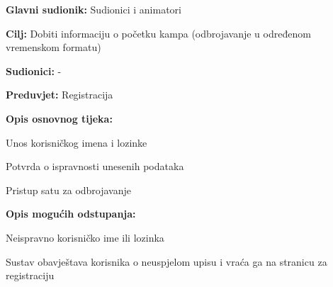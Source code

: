 \begin{packed_item}

	\item \textbf{Glavni sudionik: }Sudionici i animatori
	\item  \textbf{Cilj:} Dobiti informaciju o početku kampa (odbrojavanje u određenom vremenskom formatu)
	\item  \textbf{Sudionici:} -
	\item  \textbf{Preduvjet:} Registracija
	\item  \textbf{Opis osnovnog tijeka:}

	\item[] \begin{packed_enum}

				\item Unos korisničkog imena i lozinke
				\item Potvrda o ispravnosti unesenih podataka
				\item Pristup satu za odbrojavanje
	\end{packed_enum}

	\item  \textbf{Opis mogućih odstupanja:}

	\item[] \begin{packed_item}

				\item[2.a] Neispravno korisničko ime ili lozinka
				\item[] \begin{packed_enum}

							\item Sustav obavještava korisnika o neuspjelom upisu i vraća ga na stranicu za registraciju


				\end{packed_enum}

	\end{packed_item}
\end{packed_item}
	
